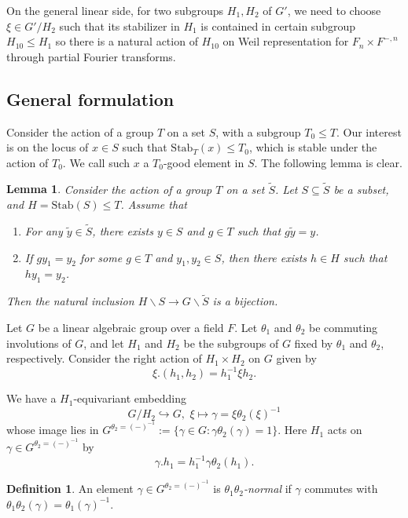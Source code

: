 \documentclass[11pt, reqno]{amsart}
\numberwithin{equation}{subsection}
\theoremstyle{plain}
\newtheorem{lem}[proposition]{Lemma}
\theoremstyle{definition}
\newtheorem{definition}[proposition]{Definition}
\begin{document}
On the general linear side, for two subgroups $H_1, H_2$ of $G'$, we need to choose $\xi \in G'/H_2$ such that its stabilizer in $H_1$ is contained in certain subgroup $H_{10} \leq H_1$ so there is a natural action of $H_{10}$ on Weil representation for $F_n \times F^{-,n}$ through partial Fourier transforms. 


\subsection{General formulation}

Consider the action of a group $T$ on a set $S$, with a subgroup $T_0 \leq T$. Our interest is on the locus of $x \in S$ such that $\mathrm{Stab}_{T}(x) \leq T_0$, which is stable under the action of $T_0$. We call such $x$ a $T_0$-good element in $S$. The following lemma is clear.

\begin{lem}
Consider the action of a group $T$ on a set $\widetilde{S}$. Let $S \subseteq \widetilde{S}$ be a subset, and $H=\mathrm{Stab}(S) \leq T$. Assume that
\begin{enumerate}
    \item For any $\widetilde{y} \in \widetilde{S}$, there exists $y \in S$ and $g \in T$ such that $g\widetilde{y}=y$.
    \item If $gy_1=y_2$ for some $g \in T$ and $y_1, y_2 \in S$, then there exists $h \in H$ such that $hy_1=y_2$.
\end{enumerate}
Then the natural inclusion $H \backslash S \to G \backslash \widetilde{S}$ is a bijection.
\end{lem}


Let $G$ be a linear algebraic group over a field $F$. 
Let $\theta_1$ and $\theta_2$ be commuting
involutions of $G$,
and let $H_1$ and $H_2$ be the subgroups of $G$ fixed
by $\theta_1$ and $\theta_2$, respectively.
Consider the right action of $H_1 \times H_2$
on $G$ given by 
\[
    \xi.(h_1, h_2) = h_1^{-1} \xi h_2.
\]


We have a $H_1$-equivariant embedding 
\[
G/H_2 \hookrightarrow G,  \, \, \xi \mapsto \gamma=\xi \theta_2(\xi)^{-1}
\]
whose image lies in $G^{\theta_2=(-)^{-1}}:=\{ \gamma \in G : \gamma \theta_2(\gamma)=1\}$. Here $H_1$ acts on $\gamma \in G^{\theta_2=(-)^{-1}}$ by
\[
    \gamma.h_1 = h_1^{-1}\gamma \theta_2(h_1).
\]



\begin{definition}
An element $\gamma \in G^{\theta_2=(-)^{-1}}$ is 
\emph{$\theta_1\theta_2$-normal} if 
$\gamma$ commutes with $\theta_1\theta_2(\gamma) = \theta_1(\gamma)^{-1}$.  
\end{definition}
\end{document}
